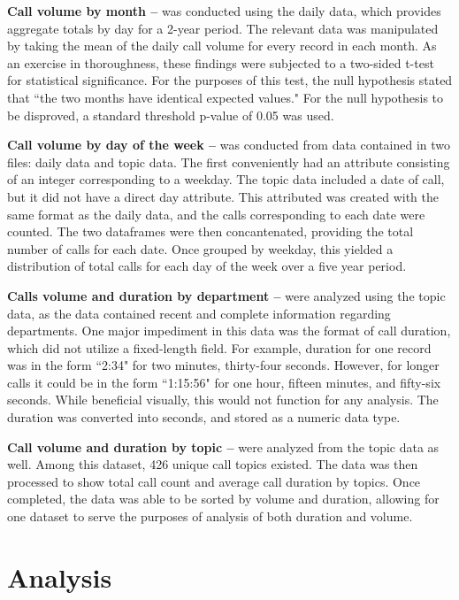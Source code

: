 \documentclass{article}
\begin{document}
\textbf{Call volume by month --} was conducted using the daily data, which provides aggregate totals by day for a 2-year period. The relevant data was manipulated by taking the mean of the daily call volume for every record in each month.  As an exercise in thoroughness, these findings were subjected to a two-sided t-test for statistical significance.  For the purposes of this test, the null hypothesis stated that ``the two months have identical expected values."  For the null hypothesis to be disproved, a standard threshold p-value of 0.05 was used.
\par
\textbf{Call volume by day of the week --} was conducted from data contained in two files: daily data and topic data.  The first conveniently had an attribute consisting of an integer corresponding to a weekday.  The topic data included a date of call, but it did not have a direct day attribute.  This attributed was created with the same format as the daily data, and the calls corresponding to each date were counted.  The two dataframes were then concantenated, providing the total number of calls for each date.  Once grouped by weekday, this yielded a distribution of total calls for each day of the week over a five year period.
\par
\textbf{Calls volume and duration by department --} were analyzed using the topic data, as the data contained recent and complete information regarding departments.  One major impediment in this data was the format of call duration, which did not utilize a fixed-length field.  For example, duration for one record was in the form ``2:34" for two minutes, thirty-four seconds.  However, for longer calls it could be in the form ``1:15:56" for one hour, fifteen minutes, and fifty-six seconds.  While beneficial visually, this would not function for any analysis.  The duration was converted into seconds, and stored as a numeric data type.
\par
\textbf{Call volume and duration by topic --} were analyzed from the topic data as well.  Among this dataset, 426 unique call topics existed.  The data was then processed to show total call count and average call duration by topics.  Once completed, the data was able to be sorted by volume and duration, allowing for one dataset to serve the purposes of analysis of both duration and volume.


\section{Analysis}
\end{document}
